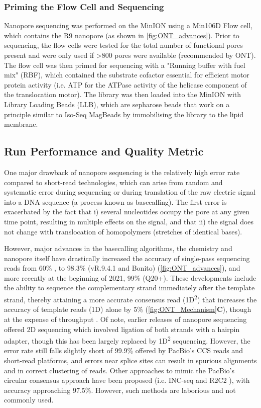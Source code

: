 \subsubsection{Priming the Flow Cell and Sequencing}
\label{sec: ONTlib_sequencing}
Nanopore sequencing was performed on the MinION using a Min106D Flow cell, which contains the R9 nanopore (as shown in \cref{fig:ONT_advances}). Prior to sequencing, the flow cells were tested for the total number of functional pores present and were only used if >800 pores were available (recommended by ONT). The flow cell was then primed for sequencing with a "Running buffer with fuel mix" (RBF), which contained the substrate cofactor essential for efficient motor protein activity (i.e. ATP for the ATPase activity of the helicase component of the translocation motor). The library was then loaded into the MinION with Library Loading Beads (LLB), which are sepharose beads that work on a principle similar to Iso-Seq MagBeads by immobilising the library to the lipid membrane.

\subsection{Run Performance and Quality Metric}
\label{ONT_performance}
One major drawback of nanopore sequencing is the relatively high error rate compared to short-read technologies, which can arise from random and systematic error during sequencing or during translation of the raw electric signal into a DNA sequence (a process known as basecalling)\cite{Rang2018}. The first error is exacerbated by the fact that i) several nucleotides occupy the pore at any given time point, resulting in multiple effects on the signal, and that ii) the signal does not change with translocation of homopolymers (stretches of identical bases).

However, major advances in the basecalling algorithms, the chemistry and nanopore itself have drastically increased the accuracy of single-pass sequencing reads from 60\% \cite{Jain2015}, to 98.3\% (vR.9.4.1 and Bonito) (\cref{fig:ONT_advances}), and more recently at the beginning of 2021, 99\% (Q20+)\cite{OxfordNanoporeTechnologiesplc.2021}. These developments include the ability to sequence the complementary strand immediately after the template strand, thereby attaining a more accurate consensus read (1D\textsuperscript{2}) that increases the accuracy of template reads (1D) alone by 5\%\cite{Rang2018} (\cref{fig:ONT_Mechanism}\textbf{C}), though at the expense of throughput \cite{NanoporeCommunityPosts}. Of note, earlier releases of nanopore sequencing offered 2D sequencing which involved ligation of both strands with a hairpin adapter, though this has been largely replaced by 1D\textsuperscript{2} sequencing. However, the error rate still falls slightly short of 99.9\% offered by PacBio's CCS reads and short-read platforms, and errors near splice sites can result in spurious alignments and in correct clustering of reads. Other approaches to mimic the PacBio's circular consensus approach have been proposed (i.e. INC-seq \cite{Li2016c} and R2C2 \cite{Volden2018}), with accuracy approaching 97.5\%. However, such methods are laborious and not commonly used.  

